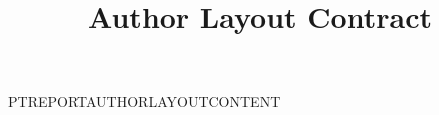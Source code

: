 \documentclass[coreonly,nominted]{pt-report}
\title{Author Layout Contract}
\date{}
\begin{document}
\maketitle
\noindent PTREPORTAUTHORLAYOUTCONTENT
\end{document}
